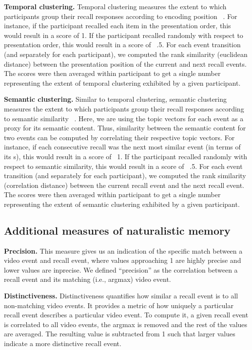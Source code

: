 \documentclass{article}
\begin{document}
\textbf{Temporal clustering.} Temporal clustering measures the extent to which participants group their recall responses according to encoding position ~\citep{PolyEtal09}. For instance, if the participant recalled each item in the presentation order, this would result in a score of 1. If the participant recalled randomly with respect to presentation order, this would result in a score of ~.5.  For each event transition (and separately for each participant), we computed the rank similarity (euclidean distance) between the presentation position  of the current and next recall events. The scores were then averaged within participant to get a single number representing the extent of temporal clustering exhibited by a given participant.

\textbf{Semantic clustering.} Similar to temporal clustering, semantic clustering measures the extent to which participants group their recall responses according to semantic similarity ~\citep{PolyEtal09}. Here, we are using the topic vectors for each event as a proxy for its semantic content. Thus, similarity between the semantic content for two events can be computed by correlating their respective topic vectors.  For instance, if each consecutive recall was the next most similar event (in terms of its s), this would result in a score of ~1. If the participant recalled randomly with respect to semantic similarity, this would result in a score of ~.5.  For each event transition (and separately for each participant), we computed the rank similarity (correlation distance) between the current recall event and the next recall event. The scores were then averaged within participant to get a single number representing the extent of semantic clustering exhibited by a given participant.

\subsection{Additional measures of naturalistic memory}
\textbf{Precision.} This measure gives us an indication of the specific match between a video event and recall event, where values approaching 1 are highly precise and lower values are inprecise.  We defined ``precision'' as the correlation between a recall event and its matching (i.e., argmax) video event.

\textbf{Distinctiveness.} Distinctiveness quantifies how similar a recall event is to all non-matching video events.  It provides a metric of how uniquely a particular recall event describes a particular video event.  To compute it, a given recall event is correlated to all video events, the argmax is removed and the rest of the values are averaged. The resulting value is subtracted from 1 such that larger values indicate a more distinctive recall event.
\end{document}
